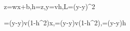 z=wx+b,\quad h=\tanh z,\quad\widehat y=vh,\quad L=(\widehat y-y)^2

=(\widehat y-y)v(1-h^2)x,\quad{}=(\widehat y-y)v(1-h^2),\quad{}=(\widehat y-y)h
